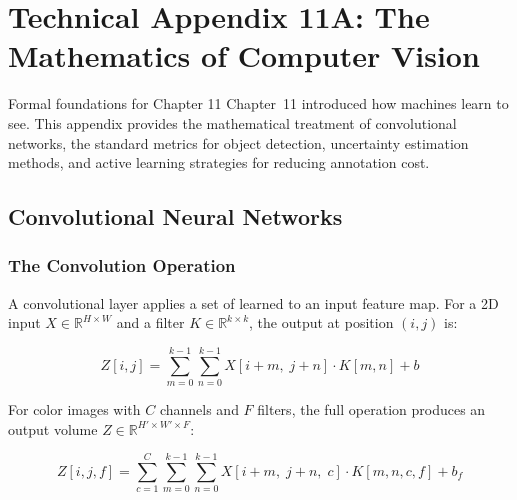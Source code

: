 
\chapter*{Technical Appendix 11A: The Mathematics of Computer Vision}

\begin{chapterquote}{Formal foundations for Chapter 11}
Chapter~11 introduced how machines learn to see. This appendix provides the mathematical treatment of convolutional networks, the standard metrics for object detection, uncertainty estimation methods, and active learning strategies for reducing annotation cost.
\end{chapterquote}

\apxnumon
\section{Convolutional Neural Networks}

\subsection{The Convolution Operation}

A convolutional layer applies a set of learned  to an input feature map. For a 2D input $X \in \mathbb{R}^{H \times W}$ and a filter $K \in \mathbb{R}^{k \times k}$, the output at position $(i, j)$ is:

\[
Z[i, j] = \sum_{m=0}^{k-1} \sum_{n=0}^{k-1} X[i+m,\; j+n] \cdot K[m, n] + b
\]

For color images with $C$ channels and $F$ filters, the full operation produces an output volume $Z \in \mathbb{R}^{H' \times W' \times F}$:

\[
Z[i, j, f] = \sum_{c=1}^{C} \sum_{m=0}^{k-1} \sum_{n=0}^{k-1}
  X[i+m,\; j+n,\; c] \cdot K[m, n, c, f] + b_f
\]


